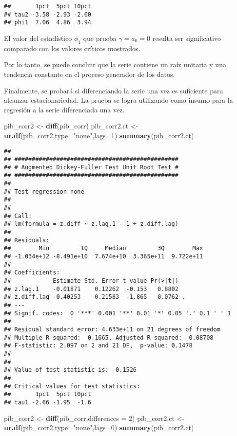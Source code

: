 \documentclass[]{book}
\newenvironment{Shaded}{\begin{snugshade}}{\end{snugshade}}
\newcommand{\KeywordTok}[1]{\textcolor[rgb]{0.13,0.29,0.53}{\textbf{#1}}}
\newcommand{\DataTypeTok}[1]{\textcolor[rgb]{0.13,0.29,0.53}{#1}}
\newcommand{\DecValTok}[1]{\textcolor[rgb]{0.00,0.00,0.81}{#1}}
\newcommand{\StringTok}[1]{\textcolor[rgb]{0.31,0.60,0.02}{#1}}
\newcommand{\NormalTok}[1]{#1}
\theoremstyle{definition}
\theoremstyle{definition}
\theoremstyle{definition}
\theoremstyle{remark}
\begin{document}
\begin{verbatim}
##       1pct  5pct 10pct
## tau2 -3.58 -2.93 -2.60
## phi1  7.06  4.86  3.94
\end{verbatim}

El valor del estadístico \(\phi_1\) que prueba \(\gamma=a_0=0\) resulta
ser significativo comparado con los valores críticos mostrados.

Por lo tanto, se puede concluir que la serie contiene un raíz unitaria y
una tendencia constante en el proceso generador de los datos.

Finalmente, se probará si diferenciando la serie una vez es suficiente
para alcanzar estacionariedad. La prueba se logra utilizando como insumo
para la regresión a la serie diferenciada una vez.

\begin{Shaded}
\begin{Highlighting}[]
\NormalTok{pib_corr2 <-}\StringTok{ }\KeywordTok{diff}\NormalTok{(pib_corr)}
\NormalTok{pib_corr2.ct <-}\StringTok{ }\KeywordTok{ur.df}\NormalTok{(pib_corr2,}\DataTypeTok{type=}\StringTok{"none"}\NormalTok{,}\DataTypeTok{lags=}\DecValTok{1}\NormalTok{)}
\KeywordTok{summary}\NormalTok{(pib_corr2.ct)}
\end{Highlighting}
\end{Shaded}

\begin{verbatim}
## 
## ############################################### 
## # Augmented Dickey-Fuller Test Unit Root Test # 
## ############################################### 
## 
## Test regression none 
## 
## 
## Call:
## lm(formula = z.diff ~ z.lag.1 - 1 + z.diff.lag)
## 
## Residuals:
##        Min         1Q     Median         3Q        Max 
## -1.034e+12 -8.491e+10  7.674e+10  3.365e+11  9.722e+11 
## 
## Coefficients:
##            Estimate Std. Error t value Pr(>|t|)  
## z.lag.1    -0.01871    0.12262  -0.153   0.8802  
## z.diff.lag -0.40253    0.21583  -1.865   0.0762 .
## ---
## Signif. codes:  0 '***' 0.001 '**' 0.01 '*' 0.05 '.' 0.1 ' ' 1
## 
## Residual standard error: 4.633e+11 on 21 degrees of freedom
## Multiple R-squared:  0.1665, Adjusted R-squared:  0.08708 
## F-statistic: 2.097 on 2 and 21 DF,  p-value: 0.1478
## 
## 
## Value of test-statistic is: -0.1526 
## 
## Critical values for test statistics: 
##       1pct  5pct 10pct
## tau1 -2.66 -1.95  -1.6
\end{verbatim}

\begin{Shaded}
\begin{Highlighting}[]
\NormalTok{pib_corr2 <-}\StringTok{ }\KeywordTok{diff}\NormalTok{(pib_corr,}\DataTypeTok{differences =} \DecValTok{2}\NormalTok{)}
\NormalTok{pib_corr2.ct <-}\StringTok{ }\KeywordTok{ur.df}\NormalTok{(pib_corr2,}\DataTypeTok{type=}\StringTok{"none"}\NormalTok{,}\DataTypeTok{lags=}\DecValTok{0}\NormalTok{)}
\KeywordTok{summary}\NormalTok{(pib_corr2.ct)}
\end{Highlighting}
\end{Shaded}
\end{document}
